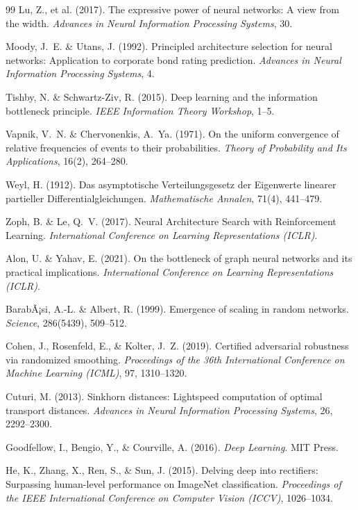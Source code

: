 ﻿\documentclass[12pt, a4paper, openany]{report}
\begin{document}
\begin{thebibliography}{99}
Lu, Z., et al. (2017).
The expressive power of neural networks: A view from the width.
\textit{Advances in Neural Information Processing Systems}, 30.

Moody, J.~E. \& Utans, J. (1992).
Principled architecture selection for neural networks:
Application to corporate bond rating prediction.
\textit{Advances in Neural Information Processing Systems}, 4.

Tishby, N. \& Schwartz-Ziv, R. (2015).
Deep learning and the information bottleneck principle.
\textit{IEEE Information Theory Workshop}, 1--5.

Vapnik, V.~N. \& Chervonenkis, A.~Ya. (1971).
On the uniform convergence of relative frequencies of events to their
probabilities.
\textit{Theory of Probability and Its Applications}, 16(2), 264--280.

Weyl, H. (1912).
Das asymptotische Verteilungsgesetz der Eigenwerte linearer partieller
Differentialgleichungen.
\textit{Mathematische Annalen}, 71(4), 441--479.

Zoph, B. \& Le, Q.~V. (2017).
Neural Architecture Search with Reinforcement Learning.
\textit{International Conference on Learning Representations (ICLR)}.

Alon, U. \& Yahav, E. (2021).
On the bottleneck of graph neural networks and its practical implications.
\textit{International Conference on Learning Representations (ICLR)}.

BarabÃ¡si, A.-L. \& Albert, R. (1999).
Emergence of scaling in random networks.
\textit{Science}, 286(5439), 509--512.

Cohen, J., Rosenfeld, E., \& Kolter, J.~Z. (2019).
Certified adversarial robustness via randomized smoothing.
\textit{Proceedings of the 36th International Conference on Machine Learning
(ICML)}, 97, 1310--1320.

Cuturi, M. (2013).
Sinkhorn distances: Lightspeed computation of optimal transport distances.
\textit{Advances in Neural Information Processing Systems}, 26, 2292--2300.

Goodfellow, I., Bengio, Y., \& Courville, A. (2016).
\textit{Deep Learning}.
MIT Press.

He, K., Zhang, X., Ren, S., \& Sun, J. (2015).
Delving deep into rectifiers: Surpassing human-level performance on ImageNet classification.
\textit{Proceedings of the IEEE International Conference on Computer Vision (ICCV)}, 1026--1034.


\end{thebibliography}
\end{document}
